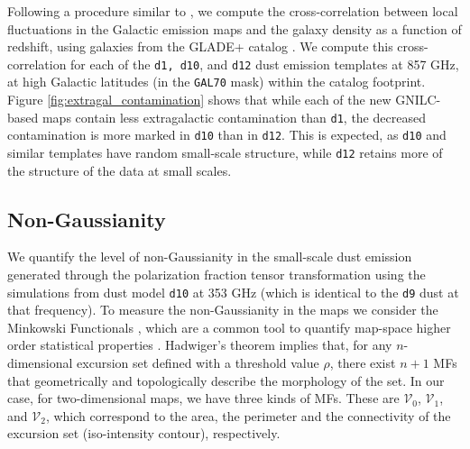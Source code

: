 \documentclass[twocolumn]{aastex631}
\begin{document}
Following a procedure similar to \citet{Chiang:2019}, we compute the cross-correlation between local fluctuations in the Galactic emission maps and the galaxy density as a function of redshift, using galaxies from the GLADE+ catalog \citep{Dalya:2022}. We compute this cross-correlation for each of the \texttt{d1, d10}, and \texttt{d12} dust emission templates at 857 GHz, at high Galactic latitudes (in the \texttt{GAL70} mask) within the catalog footprint. Figure \ref{fig:extragal_contamination} shows that while each of the new GNILC-based maps contain less extragalactic contamination than \texttt{d1}, the decreased contamination is more marked in \texttt{d10} than in \texttt{d12}. This is expected, as \texttt{d10} and similar templates have random small-scale structure, while \texttt{d12} retains more of the structure of the data at small scales. 


\subsection{Non-Gaussianity} \label{sec:nongaussianity}

We quantify the level of non-Gaussianity in the small-scale dust emission generated through the polarization fraction tensor transformation using the simulations from dust model \texttt{d10} at 353 GHz (which is identical to the \texttt{d9} dust at that frequency). To measure the non-Gaussianity in the maps we consider the Minkowski Functionals \citep[MFs,][]{Minkowski1903}, which are a common tool to quantify map-space higher order statistical properties \citep{Martire:2023, Carones:2024}. 
Hadwiger’s theorem \citep{hadwigerVorlesungenUeberInhalt1957}
implies that, for any $n$-dimensional excursion set defined with a threshold value $\rho$, there exist $n+1$ MFs that geometrically and topologically describe the morphology of the set. In our case, for two-dimensional maps, we have three kinds of MFs. These are $\mathcal{V}_0$, $\mathcal{V}_1$, and $\mathcal{V}_2$, which correspond to the area, the perimeter and the connectivity of the excursion set (iso-intensity contour), respectively.
\end{document}
